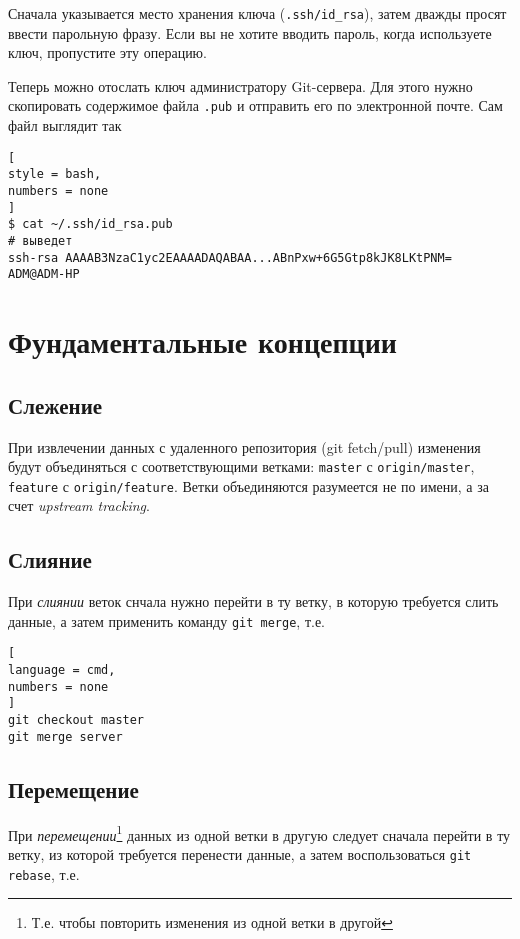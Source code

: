\documentclass[%
	11pt,
	a4paper,
	utf8,
		]{article}
\begin{document}
Сначала указывается место хранения ключа (\texttt{.ssh/id\_rsa}), затем дважды просят ввести парольную фразу. Если вы не хотите вводить пароль, когда используете ключ, пропустите эту операцию.

Теперь можно отослать ключ администратору Git-сервера. Для этого нужно скопировать содержимое файла \texttt{.pub} и отправить его по электронной почте. Сам файл выглядит так
\begin{lstlisting}[
style = bash,
numbers = none
]
$ cat ~/.ssh/id_rsa.pub
# выведет
ssh-rsa AAAAB3NzaC1yc2EAAAADAQABAA...ABnPxw+6G5Gtp8kJK8LKtPNM= ADM@ADM-HP
\end{lstlisting}


\section{Фундаментальные концепции}

\subsection{Слежение}

При извлечении данных с удаленного репозитория (git fetch/pull) изменения будут объединяться с соответствующими ветками: \texttt{master} с \texttt{origin/master}, \texttt{feature} с \texttt{origin/feature}. Ветки объединяются разумеется не по имени, а за счет \emph{upstream tracking}. 

\subsection{Слияние}

При \emph{слиянии} веток снчала нужно перейти в ту ветку, в которую требуется слить данные, а затем применить команду \texttt{git merge}, т.е.

\begin{lstlisting}[
language = cmd,
numbers = none
]
git checkout master
git merge server
\end{lstlisting}

\subsection{Перемещение}

При \emph{перемещении}\footnote{Т.е. чтобы повторить изменения из одной ветки в другой} данных из одной ветки в другую следует сначала перейти в ту ветку, из которой требуется перенести данные, а затем воспользоваться \texttt{git rebase}, т.е.
\end{document}
